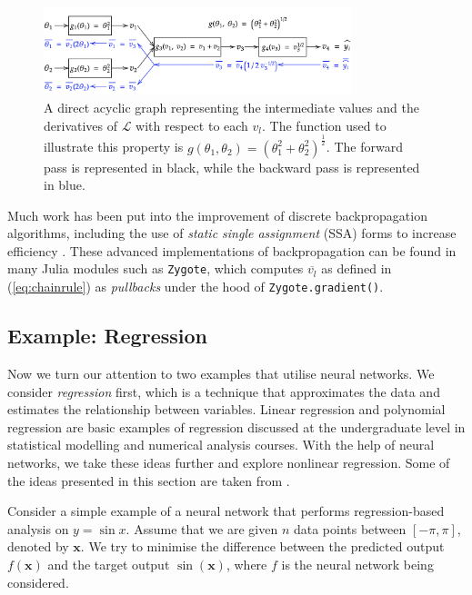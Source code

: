 \documentclass[a4paper,11pt,titlepage]{article}
\theoremstyle{definition}
\theoremstyle{plain}
\theoremstyle{remark}
\begin{document}
\begin{figure}[htbp]\label{discretebackprop}
    \centering
    \includegraphics[width=0.8\textwidth]{report/figures/backpropdiscrete.png}
    \caption{A direct acyclic graph representing the intermediate values and the derivatives of $\mathcal{L}$ with respect to each $v_l$. The function used to illustrate this property is $g(\theta_1, \theta_2) = (\theta_1^2 + \theta_2^2)^\frac{1}{2}$. The forward pass is represented in black, while the backward pass is represented in blue.}
    \label{fig:discretebackprop}
\end{figure}

Much work has been put into the improvement of discrete backpropagation algorithms, including the use of \textit{static single assignment} (SSA) forms to increase efficiency \cite{innes2019}. These advanced implementations of backpropagation can be found in many Julia modules such as \texttt{Zygote}, which computes $\overline{v_l}$ as defined in (\ref{eq:chainrule}) as \textit{pullbacks} under the hood of \texttt{Zygote.gradient()}.

\subsection{Example: Regression}
\label{sec:regex}

Now we turn our attention to two examples that utilise neural networks. We consider \textit{regression} first, which is a technique that approximates the data and estimates the relationship between variables. Linear regression and polynomial regression are basic examples of regression discussed at the undergraduate level in statistical modelling and numerical analysis courses. With the help of neural networks, we take these ideas further and explore nonlinear regression. Some of the ideas presented in this section are taken from \cite{SciMLSANUM2024}.

Consider a simple example of a neural network that performs regression-based analysis on $y = \sin x$. Assume that we are given $n$ data points between $[-\pi, \pi]$, denoted by $\mathbf{x}$. We try to minimise the difference between the predicted output $f(\mathbf{x})$ and the target output $\sin (\mathbf{x})$, where $f$ is the neural network being considered.
\end{document}
